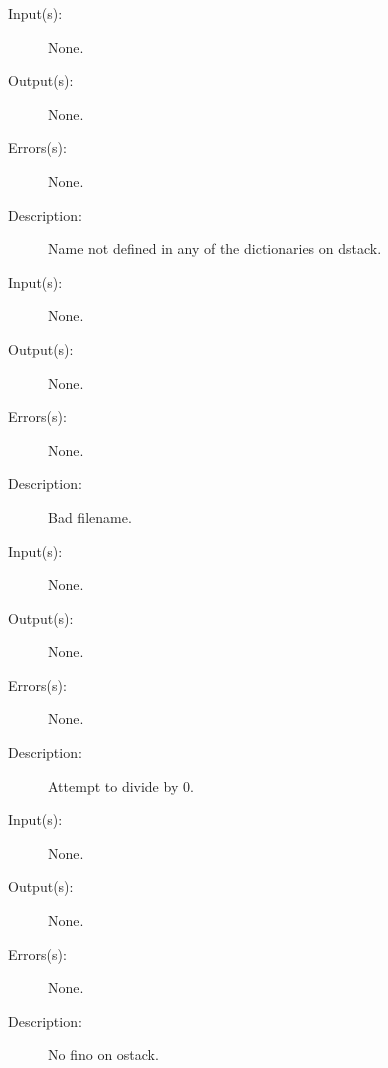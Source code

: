 \begin{description}
	\begin{description}\item[]
	\item[Input(s): ] None.
	\item[Output(s): ] None.
	\item[Errors(s): ] None.
	\item[Description: ]
		Name not defined in any of the dictionaries on dstack.
	\end{description}
\label{undefinedfilename}
\label{errordict:undefinedfilename}
\item[{\onyxop{--}{undefinedfilename}{--}}: ]
	\begin{description}\item[]
	\item[Input(s): ] None.
	\item[Output(s): ] None.
	\item[Errors(s): ] None.
	\item[Description: ]
		Bad filename.
	\end{description}
\label{undefinedresult}
\label{errordict:undefinedresult}
\item[{\onyxop{--}{undefinedresult}{--}}: ]
	\begin{description}\item[]
	\item[Input(s): ] None.
	\item[Output(s): ] None.
	\item[Errors(s): ] None.
	\item[Description: ]
		Attempt to divide by 0.
	\end{description}
\label{unmatchedfino}
\label{errordict:unmatchedfino}
\item[{\onyxop{--}{unmatchedfino}{--}}: ]
	\begin{description}\item[]
	\item[Input(s): ] None.
	\item[Output(s): ] None.
	\item[Errors(s): ] None.
	\item[Description: ]
		No fino on ostack.
	\end{description}
\label{unmatchedmark}
\label{errordict:unmatchedmark}
\item[{\onyxop{--}{unmatchedmark}{--}}: ]
	\begin{description}\item[]

\end{description}
\end{description}

